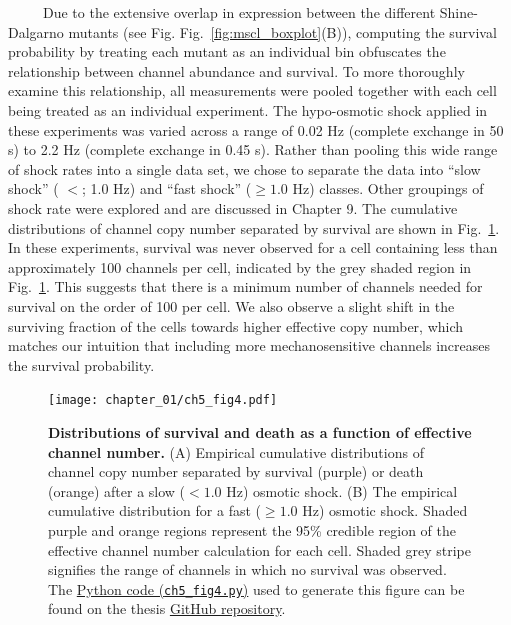 \documentclass[12pt]{caltech_thesis}
\begin{document}
~~~~~Due to the extensive overlap in expression between the different
Shine-Dalgarno mutants (see Fig. Fig.~\ref{fig:mscl_boxplot}(B)),
computing the survival probability by treating each mutant as an
individual bin obfuscates the relationship between channel abundance and
survival. To more thoroughly examine this relationship, all measurements
were pooled together with each cell being treated as an individual
experiment. The hypo-osmotic shock applied in these experiments was
varied across a range of 0.02 Hz (complete exchange in 50 s) to 2.2 Hz
(complete exchange in 0.45 s). Rather than pooling this wide range of
shock rates into a single data set, we chose to separate the data into
``slow shock'' ( \(<\); 1.0 Hz) and ``fast shock'' (\(\geq 1.0\) Hz)
classes. Other groupings of shock rate were explored and are discussed
in Chapter 9. The cumulative distributions of channel copy number
separated by survival are shown in Fig.~\ref{fig:survival_dists}. In
these experiments, survival was never observed for a cell containing
less than approximately 100 channels per cell, indicated by the grey
shaded region in Fig.~\ref{fig:survival_dists}. This suggests that there
is a minimum number of channels needed for survival on the order of 100
per cell. We also observe a slight shift in the surviving fraction of
the cells towards higher effective copy number, which matches our
intuition that including more mechanosensitive channels increases the
survival probability.

\hypertarget{fig:survival_dists}{%
\begin{figure}
\centering
\texttt{[image: chapter\_01/ch5\_fig4.pdf]}
\caption[{Distributions of survival and death as a function of effective
MscL channel number.}]{\textbf{Distributions of survival and death as a
function of effective channel number.} (A) Empirical cumulative
distributions of channel copy number separated by survival (purple) or
death (orange) after a slow (\(< 1.0\) Hz) osmotic shock. (B) The
empirical cumulative distribution for a fast (\(\geq 1.0\) Hz) osmotic
shock. Shaded purple and orange regions represent the 95\% credible
region of the effective channel number calculation for each cell. Shaded
grey stripe signifies the range of channels in which no survival was
observed. The
\href{https://github.com/gchure/phd/blob/master/src/chapter_05/code/ch5_fig4.py}{Python
code (\texttt{ch5\_fig4.py})} used to generate this figure can be found
on the thesis \href{https://github.com/gchure/phd}{GitHub repository}.}
\label{fig:survival_dists}
\end{figure}
}
\end{document}

